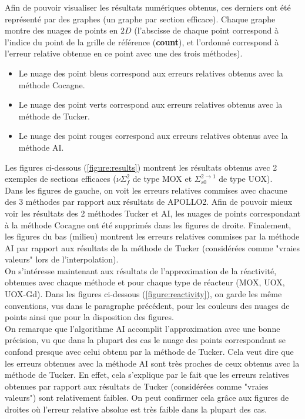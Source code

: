 Afin de pouvoir visualiser les résultats numériques obtenus, ces derniers ont été représenté par des graphes (un graphe par section efficace). Chaque graphe montre des nuages de points en $2D$ (l'abscisse de chaque point correspond à l'indice du point de la grille de référence (\textbf{count}), et l'ordonné correspond à l'erreur relative obtenue en ce point avec une des trois méthodes).
\begin{itemize}
\item Le nuage des point bleus correspond aux erreurs relatives obtenus avec la méthode Cocagne.
\item Le nuage des point verts correspond aux erreurs relatives obtenus avec la méthode de Tucker.
\item Le nuage des point rouges correspond aux erreurs relatives obtenus avec la méthode AI.
\end{itemize}
\hspace{0.5cm} Les figures ci-dessous (\ref{figure:results}) montrent les résultats obtenus avec 2 exemples de sections efficaces ($\nu\Sigma_f^2$ de type MOX et $\Sigma_{s0}^{2\rightarrow1}$ de type UOX).\\
Dans les figures de gauche, on voit les erreurs relatives commises avec chacune des 3 méthodes par rapport aux résultats de APOLLO2. Afin de pouvoir mieux voir les résultats des 2 méthodes Tucker et AI, les nuages de points correspondant à la méthode Cocagne ont été supprimés dans les figures de droite. Finalement, les figures du bas (milieu) montrent les erreurs relatives commises par la méthode AI par rapport aux résultats de la méthode de Tucker (considérées comme "vraies valeurs" lors de l'interpolation).\\
\hspace{0.5cm} On s'intéresse maintenant aux résultats de l'approximation de la réactivité, obtenues avec chaque méthode et pour chaque type de réacteur (MOX, UOX, UOX-Gd). Dans les figures ci-dessous (\ref{figure:reactivity}), on garde les même conventions, vus dans le paragraphe précédent, pour les couleurs des nuages de points ainsi que pour la disposition des figures.\\

\hspace{0.5cm} On remarque que l'algorithme AI accomplit l'approximation avec une bonne précision, vu que dans la plupart des cas le nuage des points correspondant se confond presque avec celui obtenu par la méthode de Tucker. Cela veut dire que les erreurs obtenues avec la méthode AI sont très proches de ceux obtenus avec la méthode de Tucker. En effet, cela s'explique par le fait que les erreurs relatives obtenues par rapport aux résultats de Tucker (considérées comme "vraies valeurs") sont relativement faibles. On peut confirmer cela grâce aux figures de droites où l'erreur relative absolue est très faible dans la plupart des cas.\\


